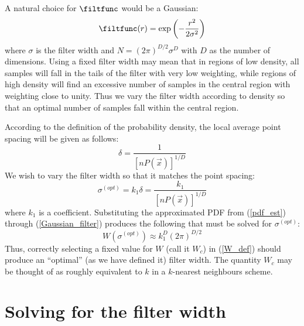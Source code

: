 A natural choice for $\filtfunc$ would be a Gaussian:
\begin{equation}
\filtfunc(r) = \exp \left (- \frac{r^2}{2 \sigma^2} \right )
\label{Gaussian_filter}
\end{equation}
where $\sigma$ is the filter width and $N = (2 \pi)^{D/2} \sigma^D$
with $D$ as the number of dimensions.  Using a fixed filter width
may mean that in regions of low density, all samples will fall in
the tails of the filter with very low weighting, while regions of
high density will find an excessive number of samples in the central
region with weighting close to unity.  Thus we vary the
filter width according to density so that an optimal number of
samples fall within the central region.

According to the definition of the probability density, the local
average point spacing will be given as follows:
\begin{equation}
\delta = \frac{1}{\left [ n P(\vec x) \right ]^{1/D}}
\end{equation}
We wish to vary the filter width so that it matches the point spacing:
\begin{equation}
\sigma^{(opt)} = k_1 \delta = \frac{k_1}{\left [ n P(\vec x) \right ]^{1/D}}
\end{equation}
where $k_1$ is a coefficient.
Substituting the approximated PDF from (\ref{pdf_est}) through
(\ref{Gaussian_filter}) produces the
following that must be solved for $\sigma^{(opt)}$:
\begin{equation}
W (\sigma^{(opt)}) \approx k_1^D (2 \pi)^{D/2}
\label{opt_filt2}
\end{equation}
Thus, correctly selecting a fixed value for $W$ (call it $W_c$) in
(\ref{W_def}) should produce an ``optimal'' (as we have defined it)
filter width. 
The quantity $W_c$ may be thought of as roughly equivalent to $k$ in a
$k$-nearest neighbours scheme.

\section{Solving for the filter width}

